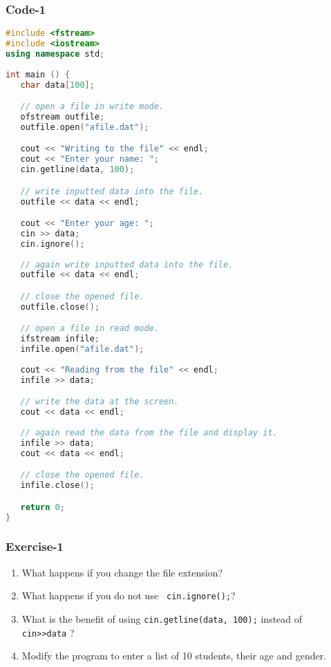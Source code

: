\documentclass{article}
\begin{document}
\subsubsection*{Code-1}

\begin{lstlisting}[language=C++]
#include <fstream>
#include <iostream>
using namespace std;
 
int main () {
   char data[100];

   // open a file in write mode.
   ofstream outfile;
   outfile.open("afile.dat");

   cout << "Writing to the file" << endl;
   cout << "Enter your name: "; 
   cin.getline(data, 100);

   // write inputted data into the file.
   outfile << data << endl;

   cout << "Enter your age: "; 
   cin >> data;
   cin.ignore();
   
   // again write inputted data into the file.
   outfile << data << endl;

   // close the opened file.
   outfile.close();

   // open a file in read mode.
   ifstream infile; 
   infile.open("afile.dat"); 
 
   cout << "Reading from the file" << endl; 
   infile >> data; 

   // write the data at the screen.
   cout << data << endl;
   
   // again read the data from the file and display it.
   infile >> data; 
   cout << data << endl; 

   // close the opened file.
   infile.close();

   return 0;
}
\end{lstlisting}

\subsubsection*{Exercise-1}
\begin{enumerate}
\item What happens if you change the file extension?

\item What happens if you do not use \verb| cin.ignore();|?

\item What is the benefit of using \verb|cin.getline(data, 100);| instead of \verb| cin>>data| ?

\item Modify the program to enter a list of 10 students, their age and gender.
\end{enumerate}
\end{document}
